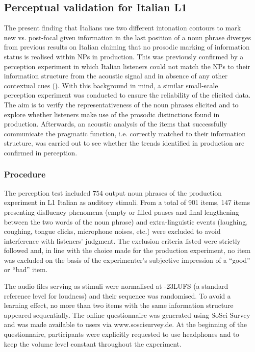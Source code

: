 \subsection{Perceptual validation for Italian L1}
\hypertarget{Toc191305900}{}
The present finding that Italians use two different intonation contours to mark new vs. post-focal given information in the last position of a noun phrase diverges from previous results on Italian claiming that no prosodic marking of information status is realised within NPs in production. This was previously confirmed by a perception experiment in which Italian listeners could not match the NPs to their information structure from the acoustic signal and in absence of any other contextual cues (\citealt{KrahmerSwerts2008}). With this background in mind, a similar small-scale perception experiment was conducted to ensure the reliability of the elicited data. The aim is to verify the representativeness of the noun phrases elicited and to explore whether listeners make use of the prosodic distinctions found in production. Afterwards, an acoustic analysis of the items that successfully communicate the pragmatic function, i.e. correctly matched to their information structure, was carried out to see whether the trends identified in production are confirmed in perception.

\subsubsection{Procedure}
\hypertarget{Toc191305901}{}
The perception test included 754 output noun phrases of the production experiment in L1 Italian as auditory stimuli. From a total of 901 items, 147 items presenting disfluency phenomena (empty or filled pauses and final lengthening between the two words of the noun phrase) and extra-linguistic events (laughing, coughing, tongue clicks, microphone noises, etc.) were excluded to avoid interference with listeners’ judgment. The exclusion criteria listed were strictly followed and, in line with the choice made for the production experiment, no item was excluded on the basis of the experimenter’s subjective impression of a “good” or “bad” item.

The audio files serving as stimuli were normalised at -23LUFS (a standard reference level for loudness) and their sequence was randomised. To avoid a learning effect, no more than two items with the same information structure appeared sequentially. The online questionnaire was generated using SoSci Survey \citep{Leiner2019} and was made available to users via www.soscisurvey.de. At the beginning of the questionnaire, participants were explicitly requested to use headphones and to keep the volume level constant throughout the experiment.

